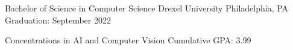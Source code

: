 

\begin{cventries}

  \cventry
    {Bachelor of Science in Computer Science} %
    {Drexel University} %
    {Philadelphia, PA} %
    {Graduation: September 2022} %
    {}
  \vspace*{-.4cm}
  
  \cventry
    {Concentrations in AI and Computer Vision}
    {}
    {}
    {Cumulative GPA: 3.99}
    {}

\end{cventries}

